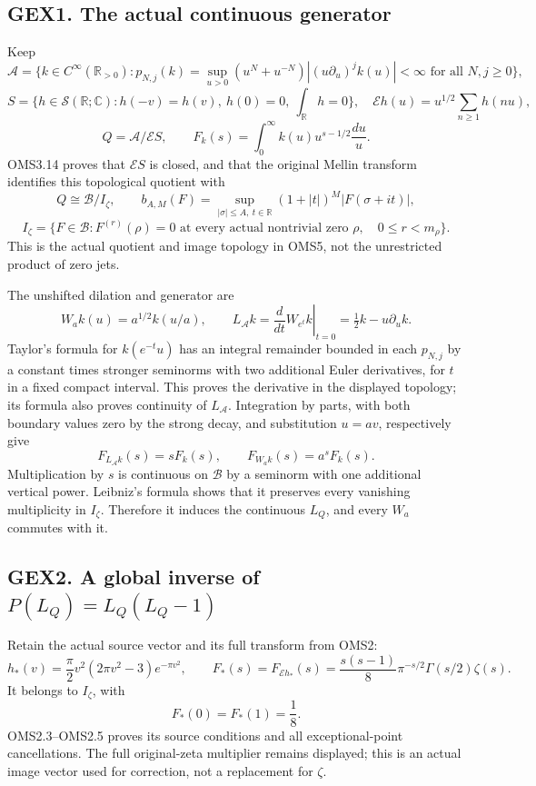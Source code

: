 \subsection{GEX1. The actual continuous
generator}\label{gex1.-the-actual-continuous-generator}

Keep \[
\mathcal A=\{k\in C^\infty(\mathbb R_{>0}):
p_{N,j}(k)=\sup_{u>0}(u^N+u^{-N})|(u\partial_u)^jk(u)|<\infty
\text{ for all }N,j\ge0\},
\] \[
S=\{h\in\mathcal S(\mathbb R;\mathbb C):
h(-v)=h(v),\ h(0)=0,\ \int_{\mathbb R}h=0\},
\quad
\mathcal Eh(u)=u^{1/2}\sum_{n\ge1}h(nu),
\] \[
Q=\mathcal A/\mathcal ES,\qquad
F_k(s)=\int_0^\infty k(u)u^{s-1/2}\frac{du}{u}.
\tag{GEX1.1}
\] OMS3.14 proves that \(\mathcal ES\) is closed, and that the original
Mellin transform identifies this topological quotient with \[
Q\cong\mathcal B/I_\zeta,\qquad
b_{A,M}(F)=\sup_{|\sigma|\le A,\ t\in\mathbb R}
(1+|t|)^M|F(\sigma+it)|,
\] \[
I_\zeta=\{F\in\mathcal B:F^{(r)}(\rho)=0
\text{ at every actual nontrivial zero }\rho,\quad 0\le r<m_\rho\}.
\tag{GEX1.2}
\] This is the actual quotient and image topology in OMS5, not the
unrestricted product of zero jets.

The unshifted dilation and generator are \[
W_a k(u)=a^{1/2}k(u/a),\qquad
L_{\mathcal A}k=\left.\frac{d}{dt}W_{e^t}k\right|_{t=0}
=\tfrac12 k-u\partial_u k.
\tag{GEX1.3}
\] Taylor's formula for \(k(e^{-t}u)\) has an integral remainder bounded
in each \(p_{N,j}\) by a constant times stronger seminorms with two
additional Euler derivatives, for \(t\) in a fixed compact interval.
This proves the derivative in the displayed topology; its formula also
proves continuity of \(L_{\mathcal A}\). Integration by parts, with both
boundary values zero by the strong decay, and substitution \(u=av\),
respectively give \[
F_{L_{\mathcal A}k}(s)=sF_k(s),\qquad
F_{W_a k}(s)=a^sF_k(s).
\tag{GEX1.4}
\] Multiplication by \(s\) is continuous on \(\mathcal B\) by a seminorm
with one additional vertical power. Leibniz's formula shows that it
preserves every vanishing multiplicity in \(I_\zeta\). Therefore it
induces the continuous \(L_Q\), and every \(W_a\) commutes with it.

\subsection{\texorpdfstring{GEX2. A global inverse of
\(P(L_Q)=L_Q(L_Q-1)\)}{GEX2. A global inverse of P(L\_Q)=L\_Q(L\_Q-1)}}\label{gex2.-a-global-inverse-of-pl_ql_ql_q-1}

Retain the actual source vector and its full transform from OMS2: \[
h_*(v)=\frac{\pi}{2}v^2(2\pi v^2-3)e^{-\pi v^2},\qquad
F_*(s)=F_{\mathcal E h_*}(s)
=\frac{s(s-1)}8\pi^{-s/2}\Gamma(s/2)\zeta(s).
\tag{GEX2.1}
\] It belongs to \(I_\zeta\), with \[
F_*(0)=F_*(1)=\frac18.
\tag{GEX2.2}
\] OMS2.3--OMS2.5 proves its source conditions and all exceptional-point
cancellations. The full original-zeta multiplier remains displayed; this
is an actual image vector used for correction, not a replacement for
\(\zeta\).

